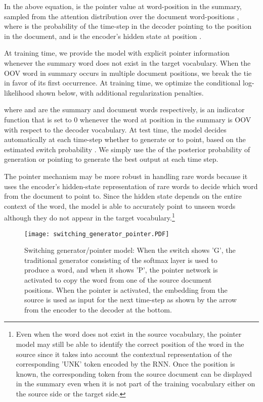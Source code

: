 \documentclass[11pt]{article}
\begin{document}
In the above equation,  is the pointer value at  word-position in the summary, sampled from the attention distribution  over the document word-positions , where  is the probability of the  time-step in the decoder pointing to the  position in the document, and  is the encoder's hidden state at position . 

At training time, we provide the model with explicit pointer information whenever the summary word does not exist in the target vocabulary. When the OOV word in summary occurs in multiple document positions, we break the tie in favor of its first occurrence. At training time, we optimize the conditional log-likelihood shown below, with additional regularization penalties.

where  and  are the summary and document words respectively,  is an indicator function that is set to 0 whenever the word at position  in the summary is OOV with respect to the decoder vocabulary. At test time, the model decides automatically at each time-step whether to generate or to point, based on the estimated switch probability .  We simply use the  of the posterior probability of generation or pointing to generate the best output at each time step.

The pointer mechanism may be more robust in handling rare words because it uses the encoder's hidden-state representation of rare words to decide which word from the document to point to. Since the hidden state depends on the entire context of the word, the model is able to accurately point to unseen words although they do not appear in the target vocabulary.\footnote{Even when the word does not exist in the source vocabulary, the pointer model may still be able to identify the correct position of the word in the source since it takes into account the contextual representation of the corresponding 'UNK' token encoded by the RNN. Once the position is known, the corresponding token from the source document can be displayed in the summary even when it is not part of the training vocabulary either on the source side or the target side.}  


\begin{figure}[ht]
    \vspace{-0.3in}
	\centering
  \texttt{[image: switching\_generator\_pointer.PDF]}
  \vspace{-0.6in}
	\caption{{\small Switching generator/pointer model: When the switch shows 'G', the traditional generator consisting of the softmax layer is used to produce a word, and when it shows 'P', the pointer network is activated to copy the word from one of the source document positions. When the pointer is activated, the embedding from the source is used as input for the next time-step as shown by the arrow from the encoder to the decoder at the bottom.}}
	\label{fig:switching_generator_pointer}
\end{figure}
\end{document}
